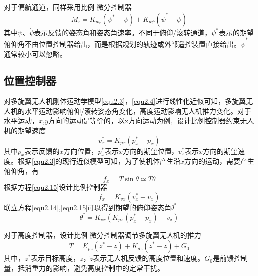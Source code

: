 对于偏航通道，同样采用比例-微分控制器
\begin{equation}
\label{equ2.13}
M_z = K_{p\psi} \left( \psi^* - \psi \right) + K_{d\psi} \left( \dot{\psi}^* -  \dot{\psi} \right)
\end{equation}
其中$\psi$、$\dot{\psi}$表示反馈的姿态角和姿态角速率。不同于俯仰/滚转通道，$\psi^*$表示的期望俯仰角不由位置控制器给出，而是根据规划的轨迹或外部遥控装置直接给出。$ \dot{\psi}^*$通常较小可以忽略。

\subsection{位置控制器}
对多旋翼无人机刚体运动学模型\eqref{equ2.3}，\eqref{equ2.4}进行线性化近似可知，多旋翼无人机的水平运动影响俯仰/滚转姿态角变化，高度运动影响无人机推力变化。对于水平运动，$x$,$y$方向的运动是等价的，以x方向运动为例，设计比例控制器约束无人机的期望速度
\begin{equation}
\label{equ2.14}
v_x^* =  K_{px} \left( p_x^* - p_x \right)
\end{equation}
其中$p_x $表示反馈的$x$方向位置，$p_x^*$表示$x$方向的期望位置，$v_x^*$表示$x$方向的期望速度。根据\eqref{equ2.3}的现行近似模型可知，为了使机体产生沿$x$方向的运动，需要产生俯仰角，有
\begin{equation}
\label{equ2.15}
f_x = T \sin\theta \simeq T \theta
\end{equation}
根据方程\eqref{equ2.15}设计比例控制器
\begin{equation}
f_x = K_{vx} \left(  v_x^* - v_x \right)
\end{equation}
联立方程\eqref{equ2.14},\eqref{equ2.15}可以得到期望的俯仰姿态角$\theta^*$
\begin{equation}
\label{equ2.16}
\theta^* = K_{vx} \left( K_{px} \left( p_x^* - p_x \right) - v_x \right)
\end{equation}

对于高度控制器，设计比例-微分控制器调节多旋翼无人机的推力
\begin{equation}
\label{equ2.17}
T = K_{pz} \left( z^* -z  \right) + K_{dz} \left( \dot{z}^* - \dot{z}  \right) + G_0
\end{equation}
其中，$z^*$表示目标高度，$z$，$\dot{z}$表示无人机反馈的高度位置和速度。$G_0$是前馈控制量，抵消重力的影响，避免高度控制中的定常干扰。

